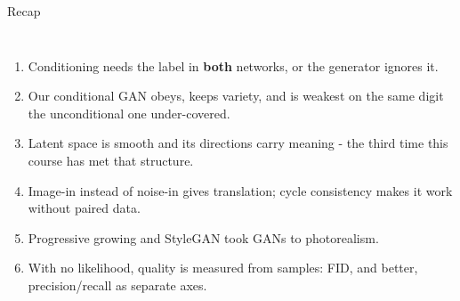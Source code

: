 \documentclass[aspectratio=169]{beamer}
\begin{document}
\begin{frame}{Recap}
  \small
  \begin{columns}[T]
    \begin{enumerate}\setlength\itemsep{2pt}
      \item Conditioning needs the label in \textbf{both} networks, or the generator
        ignores it.
      \item Our conditional GAN obeys, keeps variety, and is weakest on the same digit the
        unconditional one under-covered.
      \item Latent space is smooth and its directions carry meaning - the third time this
        course has met that structure.
      \item Image-in instead of noise-in gives translation; cycle consistency makes it work
        without paired data.
      \item Progressive growing and StyleGAN took GANs to photorealism.
      \item With no likelihood, quality is measured from samples: FID, and better,
        precision/recall as separate axes.
    \end{enumerate}
    \vskip 6pt
  \end{columns}
\end{frame}
\end{document}
